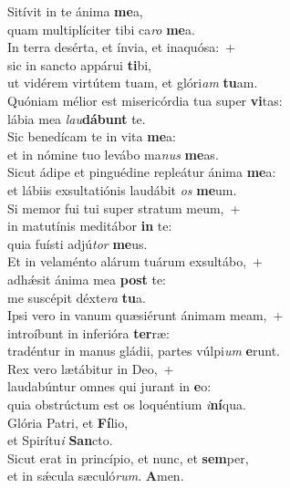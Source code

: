 \evenverse Sitívit in te ánima \textbf{me}a,~\*\\
\evenverse quam multiplíciter tibi ca\textit{ro} \textbf{me}a.\\
\oddverse In terra desérta, et ínvia, et inaquósa:~+\\
\oddverse  sic in sancto appárui \textbf{ti}bi,~\*\\
\oddverse ut vidérem virtútem tuam, et glóri\textit{am} \textbf{tu}am.\\
\evenverse Quóniam mélior est misericórdia tua super \textbf{vi}tas:~\*\\
\evenverse lábia mea \textit{lau}\textbf{dá}\textbf{bunt} te.\\
\oddverse Sic benedícam te in vita \textbf{me}a:~\*\\
\oddverse et in nómine tuo levábo ma\textit{nus} \textbf{me}as.\\
\evenverse Sicut ádipe et pinguédine repleátur ánima \textbf{me}a:~\*\\
\evenverse et lábiis exsultatiónis laudábit \textit{os} \textbf{me}um.\\
\oddverse Si memor fui tui super stratum meum,~+\\
\oddverse  in matutínis meditábor \textbf{in} te:~\*\\
\oddverse quia fuísti adjú\textit{tor} \textbf{me}us.\\
\evenverse Et in velaménto alárum tuárum exsultábo,~+\\
\evenverse  adhǽsit ánima mea \textbf{post} te:~\*\\
\evenverse me suscépit déxte\textit{ra} \textbf{tu}a.\\
\oddverse Ipsi vero in vanum quæsiérunt ánimam meam,~+\\
\oddverse  introíbunt in inferióra \textbf{ter}ræ:~\*\\
\oddverse tradéntur in manus gládii, partes vúlpi\textit{um} \textbf{e}runt.\\
\evenverse Rex vero lætábitur in Deo,~+\\
\evenverse  laudabúntur omnes qui jurant in \textbf{e}o:~\*\\
\evenverse quia obstrúctum est os loquéntium \textit{i}\textbf{ní}qua.\\
\oddverse Glória Patri, et \textbf{Fí}lio,~\*\\
\oddverse et Spirítu\textit{i} \textbf{San}cto.\\
\evenverse Sicut erat in princípio, et nunc, et \textbf{sem}per,~\*\\
\evenverse et in sǽcula sæculó\textit{rum}. \textbf{A}men.\\
